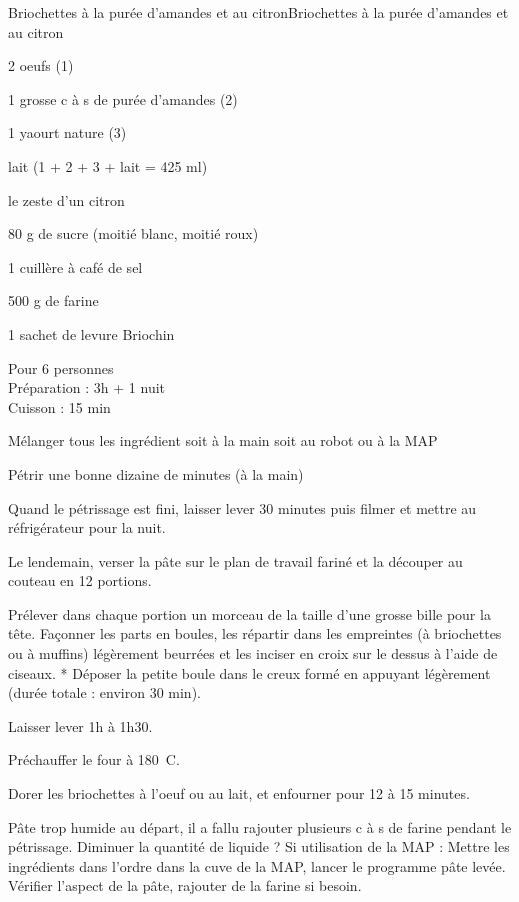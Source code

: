 \begin{recette}{Briochettes à la purée d'amandes et au citron}{Briochettes à la purée d'amandes et au citron}

\begin{ingredients}
2 oeufs (1)\par
1 grosse c à s de purée d'amandes (2)\par
1 yaourt nature (3)\par
lait (1 + 2 + 3 + lait = 425 ml)\par
le zeste d'un citron\par
80 g de sucre (moitié blanc, moitié roux)\par
1 cuillère à café de sel\par
500 g de farine\par
1 sachet de levure Briochin\par
\end{ingredients}

\begin{infos}
Pour 6 personnes\\
Préparation : 3h + 1 nuit\\
Cuisson : 15 min\\
\end{infos}

\begin{etapes}
\item Mélanger tous les ingrédient soit à la main soit au robot ou à la MAP
\item Pétrir une bonne dizaine de minutes (à la main)
\item Quand le pétrissage est fini, laisser lever 30 minutes puis filmer et mettre au réfrigérateur pour la nuit.
\item Le lendemain, verser la pâte sur le plan de travail fariné et la découper au couteau en 12 portions.
\item Prélever dans chaque portion un morceau de la taille d'une grosse bille pour la tête. Façonner les parts en boules, les répartir dans les empreintes (à briochettes ou à muffins) légèrement beurrées et les inciser en croix sur le dessus à l'aide de ciseaux. * Déposer la petite boule dans le creux formé en appuyant légèrement (durée totale : environ 30 min).
\item Laisser lever 1h à 1h30.
\item Préchauffer le four à 180\ C.
\item Dorer les briochettes à l'oeuf ou au lait, et enfourner pour 12 à 15 minutes.
\end{etapes}

\begin{conseils}
Pâte trop humide au départ, il a fallu rajouter plusieurs c à s de farine pendant le pétrissage. Diminuer la quantité de liquide ?
Si utilisation de la MAP : Mettre les ingrédients dans l'ordre dans la cuve de la MAP, lancer le programme pâte levée. Vérifier l'aspect de la pâte, rajouter de la farine si besoin.
\end{conseils}

\end{recette}
